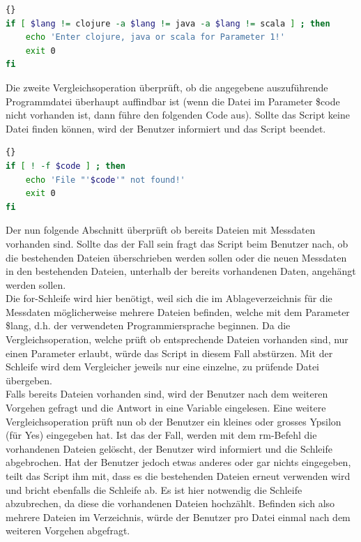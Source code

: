 \documentclass{fancydocument}
\begin{document}
\noindent
\begin{minipage}{\textwidth}
\begin{lstlisting}[language=bash,caption=Sprachparameter prüfen]{}
if [ $lang != clojure -a $lang != java -a $lang != scala ] ; then
	echo 'Enter clojure, java or scala for Parameter 1!'
	exit 0
fi
\end{lstlisting}
\end{minipage}

Die zweite Vergleichsoperation überprüft, ob die angegebene auszuführende Programmdatei überhaupt auffindbar ist (wenn die Datei im Parameter \$code nicht vorhanden ist, dann führe den folgenden Code aus). Sollte das Script keine Datei finden können, wird der Benutzer informiert und das Script beendet.

\noindent
\begin{minipage}{\textwidth}
\begin{lstlisting}[language=bash,caption=Jar-Datei prüfen]{}
if [ ! -f $code ] ; then
	echo 'File "'$code'" not found!'
	exit 0
fi
\end{lstlisting}
\end{minipage}

Der nun folgende Abschnitt überprüft ob bereits Dateien mit Messdaten vorhanden sind. Sollte das der Fall sein fragt das Script beim Benutzer nach, ob die bestehenden Dateien überschrieben werden sollen oder die neuen Messdaten in den bestehenden Dateien, unterhalb der bereits vorhandenen Daten, angehängt werden sollen.
\\
Die for-Schleife wird hier benötigt, weil sich die im Ablageverzeichnis für die Messdaten möglicherweise mehrere Dateien befinden, welche mit dem Parameter \$lang, d.h. der verwendeten Programmiersprache beginnen.  Da die Vergleichsoperation, welche prüft ob entsprechende Dateien vorhanden sind, nur einen Parameter erlaubt, würde das Script in diesem Fall abstürzen. Mit der Schleife wird dem Vergleicher jeweils nur eine einzelne, zu prüfende Datei übergeben.
\\
Falls bereits Dateien vorhanden sind, wird der Benutzer nach dem weiteren Vorgehen gefragt und die Antwort in eine Variable eingelesen. Eine weitere Vergleichsoperation prüft nun ob der Benutzer ein kleines oder grosses Ypsilon (für Yes) eingegeben hat. Ist das der Fall, werden mit dem rm-Befehl die vorhandenen Dateien gelöscht, der Benutzer wird informiert und die Schleife abgebrochen. Hat der Benutzer jedoch etwas anderes oder gar nichts eingegeben, teilt das Script ihm mit, dass es die bestehenden Dateien erneut verwenden wird und bricht ebenfalls die Schleife ab. Es ist hier notwendig die Schleife abzubrechen, da diese die vorhandenen Dateien hochzählt.  Befinden sich also mehrere Dateien im Verzeichnis, würde der Benutzer pro Datei einmal nach dem weiteren Vorgehen abgefragt.
\end{document}
